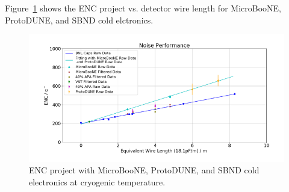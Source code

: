 \label{sec:appendix}

Figure~\ref{fig:noise_otherExps} shows the ENC project vs. detector wire length for 
MicroBooNE, ProtoDUNE, and SBND cold elctronics. 
\begin{figure}[h!]
\centering
  \includegraphics[width=1.0\linewidth]{figures/noise_otherExps.png}
  \caption{ENC project with MicroBooNE, ProtoDUNE, and SBND cold electronics at cryogenic temperature.}
  \label{fig:noise_otherExps}
\end{figure}

